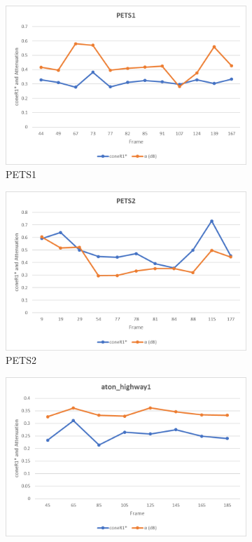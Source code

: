 \begin{appendices}
\clearpage
\FloatBarrier
\begin{figure}
  \begin{subfigure}{.45\linewidth}
  \includegraphics[width=1\linewidth]{figures/appendix/pets1_db.jpg}
  \caption{PETS1}
\end{subfigure}
\hfill
\begin{subfigure}{.45\linewidth}
  \includegraphics[width=1\linewidth]{figures/appendix/pets2_db.jpg}
  \caption{PETS2}
\end{subfigure}
\hfill
\begin{subfigure}{.45\linewidth}
  \includegraphics[width=1\linewidth]{figures/appendix/highway1_db.jpg}

\end{subfigure}
\end{figure}
\end{appendices}
